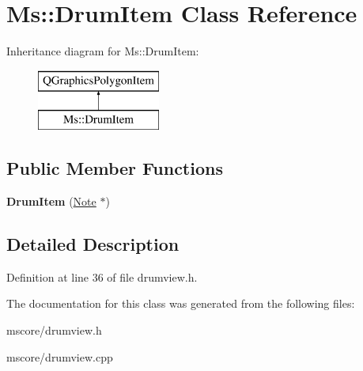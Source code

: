 \hypertarget{class_ms_1_1_drum_item}{}\section{Ms\+:\+:Drum\+Item Class Reference}
\label{class_ms_1_1_drum_item}
Inheritance diagram for Ms\+:\+:Drum\+Item\+:\begin{figure}[H]
\begin{center}
\leavevmode
\includegraphics[height=2.000000cm]{class_ms_1_1_drum_item}
\end{center}
\end{figure}
\subsection*{Public Member Functions}
\begin{DoxyCompactItemize}
\item 
\mbox{\label{class_ms_1_1_drum_item_aa99a1f6ae61d295b537c827be939d7e1}} 
{\bfseries Drum\+Item} (\hyperlink{class_ms_1_1_note}{Note} $\ast$)
\end{DoxyCompactItemize}


\subsection{Detailed Description}


Definition at line 36 of file drumview.\+h.



The documentation for this class was generated from the following files\+:\begin{DoxyCompactItemize}
\item 
mscore/drumview.\+h\item 
mscore/drumview.\+cpp\end{DoxyCompactItemize}
